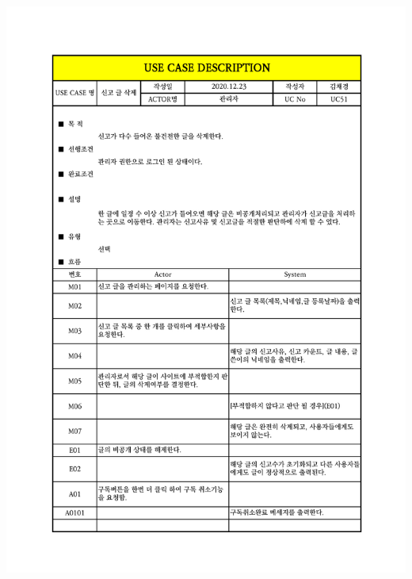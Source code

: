 {{{{{{{{{{{{{{{{{{{{{{{{{{{{{{{{{{{{{{{{{{{{{{{{{{{{{{\includegraphics[width=1.1\textwidth]{./Figure/Design/Display/usecase/051.pdf} \\
}}}}}}}}}}}}}}}}}}}}}}}}}}}}}}}}}}}}}}}}}}}}}}}}}}}}}}
